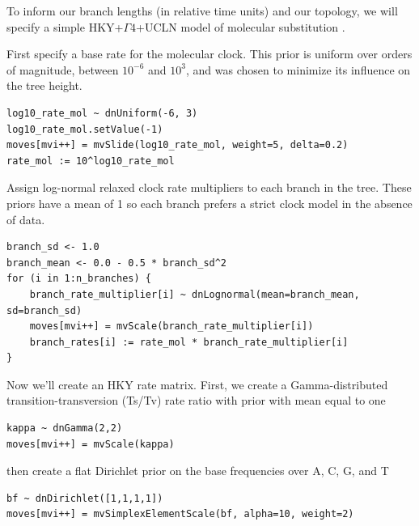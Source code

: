 To inform our branch lengths (in relative time units) and our topology, we will specify a simple HKY+$\Gamma4$+UCLN model of molecular substitution \citep{Hasegawa1985,Yang1998,Drummond2006}.

First specify a base rate for the molecular clock.
This prior is uniform over orders of magnitude, between $10^{-6}$ and $10^3$, and was chosen to minimize its influence on the tree height.

\begin{snugshade}
\begin{lstlisting}
log10_rate_mol ~ dnUniform(-6, 3)
log10_rate_mol.setValue(-1)
moves[mvi++] = mvSlide(log10_rate_mol, weight=5, delta=0.2)
rate_mol := 10^log10_rate_mol
\end{lstlisting}
\end{snugshade}

Assign log-normal relaxed clock rate multipliers to each branch in the tree.
These priors have a mean of 1 so each branch prefers a strict clock model in the absence of data.
\begin{snugshade}
\begin{lstlisting}
branch_sd <- 1.0
branch_mean <- 0.0 - 0.5 * branch_sd^2
for (i in 1:n_branches) {
    branch_rate_multiplier[i] ~ dnLognormal(mean=branch_mean, sd=branch_sd)
    moves[mvi++] = mvScale(branch_rate_multiplier[i])
    branch_rates[i] := rate_mol * branch_rate_multiplier[i]
}
\end{lstlisting}
\end{snugshade}

Now we'll create an HKY rate matrix.
First, we create a Gamma-distributed transition-transversion (Ts/Tv) rate ratio with prior with mean equal to one

\begin{snugshade}
\begin{lstlisting}
kappa ~ dnGamma(2,2)
moves[mvi++] = mvScale(kappa)
\end{lstlisting}
\end{snugshade}

then create a flat Dirichlet prior on the base frequencies over A, C, G, and T

\begin{snugshade}
\begin{lstlisting}
bf ~ dnDirichlet([1,1,1,1])
moves[mvi++] = mvSimplexElementScale(bf, alpha=10, weight=2)
\end{lstlisting}
\end{snugshade}

